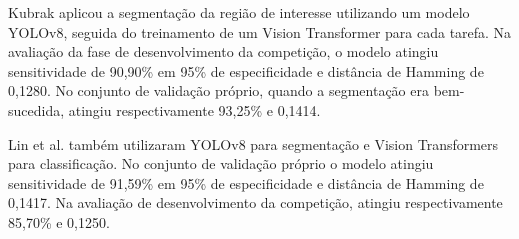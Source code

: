 \documentclass[12pt]{article}
\begin{document}
Kubrak \cite{justraigs_kubrak} aplicou a segmentação da região de interesse utilizando um modelo YOLOv8, seguida do treinamento de um Vision Transformer para cada tarefa. Na avaliação da fase de desenvolvimento da competição, o modelo atingiu sensitividade de 90,90\% em 95\% de especificidade e distância de Hamming de 0,1280. No conjunto de validação próprio, quando a segmentação era bem-sucedida, atingiu respectivamente 93,25\% e 0,1414.

Lin et al. \cite{justraigs_hu_lin} também utilizaram YOLOv8 para segmentação e Vision Transformers para classificação. No conjunto de validação próprio o modelo atingiu sensitividade de 91,59\% em 95\% de especificidade e distância de Hamming de 0,1417. Na avaliação de desenvolvimento da competição, atingiu respectivamente 85,70\% e 0,1250.



\end{document}
